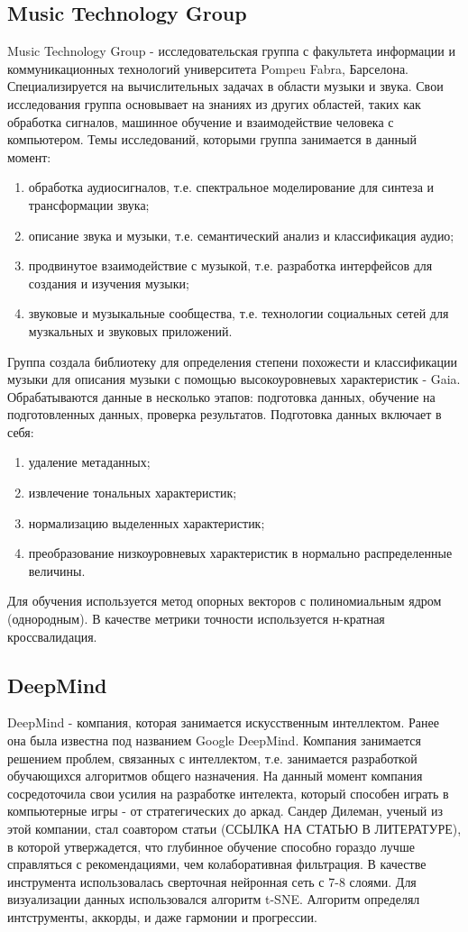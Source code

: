 \subsection{Music Technology Group}
\label{sec:analogues:mtg}
Music Technology Group - исследовательская группа с факультета информации и коммуникационных технологий университета Pompeu Fabra, Барселона. Специализируется на вычислительных задачах в области музыки и звука. Свои исследования группа основывает на знаниях из других областей, таких как обработка сигналов, машинное обучение и взаимодействие человека с компьютером. Темы исследований, которыми группа занимается в данный момент:
\begin{enumerate}
    \item обработка аудиосигналов, т.е. спектральное моделирование для синтеза и трансформации звука;
    \item описание звука и музыки, т.е. семантический анализ и классификация аудио;
    \item продвинутое взаимодействие с музыкой, т.е. разработка интерфейсов для создания и изучения музыки;
    \item звуковые и музыкальные сообщества, т.е. технологии социальных сетей для музкальных и звуковых приложений.
\end{enumerate}
Группа создала библиотеку для определения степени похожести и классификации музыки для описания музыки с помощью высокоуровневых характеристик - Gaia. Обрабатываются данные в несколько этапов: подготовка данных, обучение на подготовленных данных, проверка результатов.
Подготовка данных включает в себя:
\begin{enumerate}
  \item удаление метаданных;
  \item извлечение тональных характеристик;
  \item нормализацию выделенных характеристик;
  \item преобразование низкоуровневых характеристик в нормально распределенные величины.
\end{enumerate}
Для обучения используется метод опорных векторов с полиномиальным ядром (однородным). В качестве метрики точности используется н-кратная кроссвалидация.

\subsection{DeepMind}
\label{sec:analogues:deepmind}
DeepMind - компания, которая занимается искусственным интеллектом. Ранее она была известна под названием Google DeepMind. Компания занимается решением проблем, связанных с интеллектом, т.е. занимается разработкой обучающихся алгоритмов общего назначения. На данный момент компания сосредоточила свои усилия на разработке интелекта, который способен играть в компьютерные игры - от стратегических до аркад. Сандер Дилеман, ученый из этой компании, стал соавтором статьи (ССЫЛКА НА СТАТЬЮ В ЛИТЕРАТУРЕ), в которой утвержадется, что глубинное обучение способно гораздо лучше справляться с рекомендациями, чем колаборативная фильтрация. В качестве инструмента использовалась сверточная нейронная сеть с 7-8 слоями. Для визуализации данных использовался алгоритм t-SNE. Алгоритм определял интструменты, аккорды, и даже гармонии и прогрессии.

